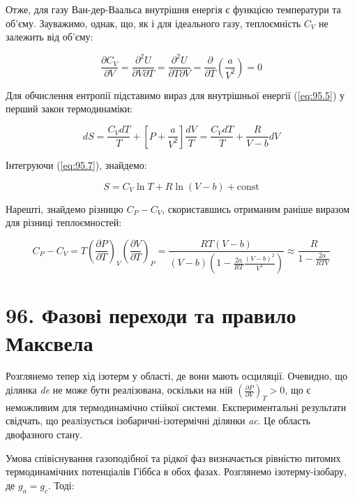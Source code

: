\documentclass{article}
\begin{document}
Отже, для газу Ван-дер-Ваальса внутрішня енергія є функцією температури та об'єму. Зауважимо, однак,
що, як і для ідеального газу, теплоємність $C_{V}$ не залежить від об'єму:

\begin{equation}
\frac{\partial C_{V}}{\partial V} = \frac{\partial^{2}U}{\partial V \partial T} =
\frac{\partial^{2}U}{\partial T \partial V} = \frac{\partial}{\partial T}\left( \frac{a}{V^{2}}
\right) = 0
\label{eq:95.6}
\end{equation}

Для обчислення ентропії підставимо вираз для внутрішньої енергії (\ref{eq:95.5}) у перший закон
термодинаміки:

\begin{equation}
dS = \frac{C_{V}dT}{T} + \left[ P + \frac{a}{V^{2}} \right]\frac{dV}{T} = \frac{C_{V}dT}{T} +
\frac{R}{V - b}dV
\label{eq:95.7}
\end{equation}

Інтегруючи (\ref{eq:95.7}), знайдемо:

\begin{equation}
S = C_{V}\ln T + R \ln (V - b) + \text{const}
\label{eq:95.8}
\end{equation}

Нарешті, знайдемо різницю $C_{P} - C_{V}$, скориставшись отриманим раніше виразом для різниці
теплоємностей:

\begin{equation}
C_{P} - C_{V} = T\left( \frac{\partial P}{\partial T} \right)_{V}\left( \frac{\partial V}{\partial T}
\right)_{P} = \frac{RT(V - b)}{(V - b)\left( 1 - \frac{2a}{RT}\frac{(V - b)^{2}}{V^{3}} \right)}
\approx \frac{R}{1 - \frac{2a}{RTV}}
\label{eq:95.9}
\end{equation}

\section*{96. Фазові переходи та правило Максвела}

Розглянемо тепер хід ізотерм у області, де вони мають осциляції. Очевидно, що ділянка \textit{de} не
може бути реалізована, оскільки на ній $\left(\frac{\partial P}{\partial V}\right)_T > 0$, що є
неможливим для термодинамічно стійкої системи. Експериментальні результати свідчать, що реалізується
ізобаричні-ізотермічні ділянки \textit{ac}. Це область двофазного стану.

Умова співіснування газоподібної та рідкої фаз визначається рівністю питомих термодинамічних
потенціалів Гіббса в обох фазах. Розглянемо ізотерму-ізобару, де $g_a = g_c$. Тоді:
\end{document}
